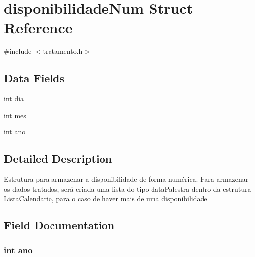 \hypertarget{structdisponibilidade_num}{}\section{disponibilidade\+Num Struct Reference}
\label{structdisponibilidade_num}


{\ttfamily \#include $<$tratamento.\+h$>$}

\subsection*{Data Fields}
\begin{DoxyCompactItemize}
\item 
int \hyperlink{structdisponibilidade_num_a3d1171ac670a8e8a672c481f22d1fa9f}{dia}
\item 
int \hyperlink{structdisponibilidade_num_a9fc86758220eae0e735655f81fd9d9bc}{mes}
\item 
int \hyperlink{structdisponibilidade_num_ac404d93cbf0169fd9e89edc17d0c5572}{ano}
\end{DoxyCompactItemize}


\subsection{Detailed Description}
Estrutura para armazenar a disponibilidade de forma numérica. Para armazenar os dados tratados, será criada uma lista do tipo data\+Palestra\textquotesingle{} dentro da estrutura \textquotesingle{}Lista\+Calendario\textquotesingle{}, para o caso de haver mais de uma disponibilidade 

\subsection{Field Documentation}
\hypertarget{structdisponibilidade_num_ac404d93cbf0169fd9e89edc17d0c5572}{}
\subsubsection[{ano}]{\setlength{\rightskip}{0pt plus 5cm}int ano}\label{structdisponibilidade_num_ac404d93cbf0169fd9e89edc17d0c5572}
\hypertarget{structdisponibilidade_num_a3d1171ac670a8e8a672c481f22d1fa9f}{}
